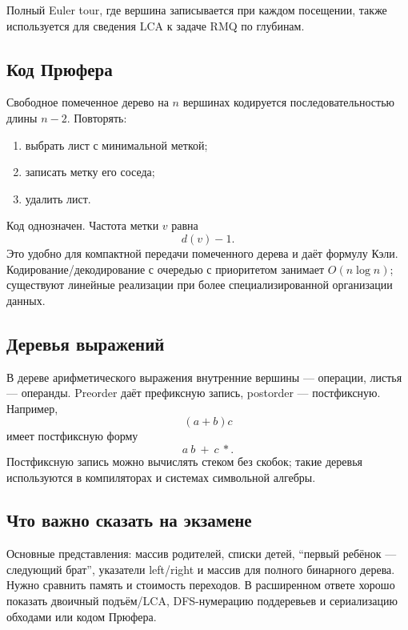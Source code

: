 Полный Euler tour, где вершина записывается при каждом посещении, также
используется для сведения LCA к задаче RMQ по глубинам.

\subsection{Код Прюфера}

Свободное помеченное дерево на $n$ вершинах кодируется последовательностью длины
$n-2$. Повторять:
\begin{enumerate}
 \item выбрать лист с минимальной меткой;
 \item записать метку его соседа;
 \item удалить лист.
\end{enumerate}

Код однозначен. Частота метки $v$ равна
\[
    d(v)-1.
\]
Это удобно для компактной передачи помеченного дерева и даёт формулу Кэли.
Кодирование/декодирование с очередью с приоритетом занимает $O(n\log n)$;
существуют линейные реализации при более специализированной организации данных.

\subsection{Деревья выражений}

В дереве арифметического выражения внутренние вершины --- операции, листья ---
операнды. Preorder даёт префиксную запись, postorder --- постфиксную. Например,
\[
    (a+b)c
\]
имеет постфиксную форму
\[
    a\ b\ +\ c\ *.
\]
Постфиксную запись можно вычислять стеком без скобок; такие деревья используются
в компиляторах и системах символьной алгебры.

\subsection{Что важно сказать на экзамене}

Основные представления: массив родителей, списки детей, ``первый ребёнок ---
следующий брат'', указатели left/right и массив для полного бинарного дерева.
Нужно сравнить память и стоимость переходов. В расширенном ответе хорошо показать
двоичный подъём/LCA, DFS-нумерацию поддеревьев и сериализацию обходами или кодом
Прюфера.

\newpage
